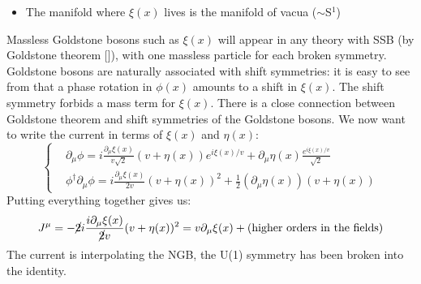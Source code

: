 \documentclass[../main.tex]{subfiles}
\begin{document}
\begin{example}
\begin{itemize}
    \item The manifold where $\xi(x)$ lives is the manifold of vacua ($\sim$S$^1$)
\end{itemize}
Massless Goldstone bosons such as $\xi(x)$ will appear in any theory with SSB (by Goldstone theorem []), with one massless particle for each broken symmetry. Goldstone bosons are naturally associated with shift symmetries: it is easy to see from  that a phase rotation in $\phi(x)$ amounts to a shift in $\xi(x)$. The shift symmetry forbids a mass term for $\xi(x)$. There is a close connection between Goldstone theorem and shift symmetries of the Goldstone bosons. We now want to write the current in terms of $\xi(x)$ and $\eta(x)$:
\[
\left\{
\begin{aligned}
&\partial_\mu\phi=i\frac{\partial_\mu\xi(x)}{v\sqrt{2}}(v+\eta(x))e^{i\xi(x)/v}+\partial_\mu\eta(x)\frac{e^{i\xi(x)/v}}{\sqrt{2}}\\
&\phi^\dagger\partial_\mu\phi=i\frac{\partial_\mu\xi(x)}{2v}(v+\eta(x))^2+\frac{1}{2}(\partial_\mu\eta(x))(v+\eta(x))
\end{aligned}
\right.
\]
Putting everything together gives us:
\[
J^\mu=-\cancel{2}i\frac{i\partial_\mu\xi(x)}{\cancel{2}v}(v+\eta(x))^2=v\partial_\mu\xi(x)+(\text{higher orders in the fields})
\]
The current is interpolating the NGB, the U(1) symmetry has been broken into the identity.
\end{example}
\end{document}
